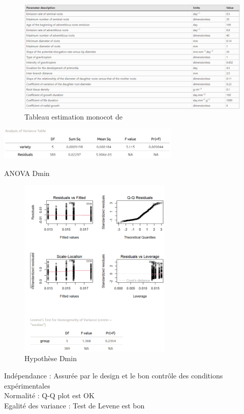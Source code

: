 \newpage

\label{an:Poaceae}
\begin{figure}[ht]
\centering
\includegraphics[width=1\textwidth]{Image/parametre Poaceae.png}
\caption{Tableau estimation monocot de \cite{gerard_modelling_2017}}
\end{figure}

\newpage

\label{an:Dmin}
\begin{table}[ht]
\centering
\includegraphics[width=0.65\textwidth]{Image/anova Dmin.png}
\caption{ANOVA Dmin}
\end{table}
\begin{figure}[ht]
\centering
\includegraphics[width=0.65\textwidth]{Image/hypothese Dmin.png}
\caption{Hypothèse Dmin}
\end{figure}
\noindent Indépendance : Assurée par le design et le bon contrôle des conditions expérimentales \\
Normalité : Q-Q plot est OK \\
Egalité des variance : Test de Levene est bon

